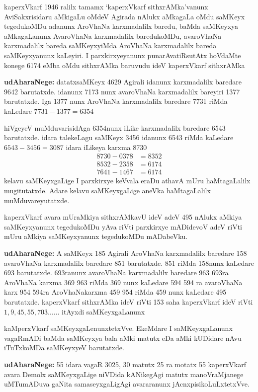 kaperxVkarf {\rm 1946} ralilx tamamx `kaperxVkarf sithxrAMka'vanunx AviSakxrisidaru aMkigaLu oMdeV Agirada nAlukx aMkagaLa oMdu saMKeyx tegedukoMDu adanunx AroVhaNa karxmadalilx baredu, baMda saMKeyxya aMkagaLanunx AvaroVhaNa karxmadalilx baredukoMDu, avaroVhaNa karxmadalilx bareda saMKeyxyiMda AroVhaNa karxmadalilx bareda saMKeyxyanunx kaLeyiri. I parxkirxyeyanunx punarAvatiRsutAtx hoVdaMte konege {\rm 6174} eMba oMdu sithxrAMka baruvudu ideV kaperxVkarf sithxrAMka

\textbf{udAharaNege:} 
datatxsaMKeyx {\rm 4629} Agirali idanunx karxmadalilx baredare {\rm 9642} barutatxde. idanunx {\rm 7173} nunx avaroVhaNa karxmadalilx bareyiri {\rm 1377} barutatxde. Iga {\rm 1377} nunx AroVhaNa karxmadalilx baredare {\rm 7731} riMda kaLedare
$7731-1377=6354$

hiVgeyeV muMduvarisidAga {\rm 6354}nunx iLike karxmadalilx baredare {\rm 6543} barutatxde. idara talekeLagu saMKeyx {\rm 3456} idanunx {6543} riMda kaLedare $6543-3456=3087$ idara iLikeya karxma {\rm 8730}
\begin{align*}
8730-0378&=8352\\
8532-2358&=6174\\
7641-1467&=6174
\end{align*}
kelavu saMKeyxgaLige I parxkirxye keVvala eraDu athavA mUru haMtagaLalilx mugitutatxde. Adare kelavu saMKeyxgaLige aneVka haMtagaLalilx muMduvareyutatxde.

kaperxVkarf avara mUraMkiya sithxrAMkavU ideV adeV {\rm 495} nAlukx aMkiya saMKeyxyanunx tegedukoMDu yAva riVti parxkirxye mADidevoV adeV riVti mUru aMkiya saMKeyxyanunx tegedukoMDu mADabeVku.

\textbf{udAharaNege:} 
A saMKeyx {\rm 185} Agirali AroVhaNa karxmadalilx baredare {\rm 158} avaroVhaNa karxmadalilx baredare {\rm 851} barutatxde.
{\rm 851} riMda {\rm 158}nunx kaLedare {\rm 693} barutatxde.
{\rm 693}ranunx avaroVhaNa karxmadalilx baredare {\rm 963} {\rm 693}ra AroVhaNa karxma {\rm 369}
{\rm 963} riMda {\rm 369} nunx kaLedare {594} {\rm 594} ra avaroVhaNa karx {\rm 954} {\rm 594}ra AroVhaNakarxma {\rm 459} {\rm 954} riMda {\rm 459} nunx kaLedare {\rm 495} barutatxde.
kaperxVkarf sithxrAMka ideV riVti {\rm 153} saha kaperxVkarf ideV riVti $1, 9, 45, 55, 703\ldots\ldots$ itAyxdi saMKeyxgaLanunx 

kaMperxVkarf saMKeyxgaLenunxtetxVve. EkeMdare I saMKeyxgaLanunx vagaRmADi baMda saMKeyxya bala aMki matutx eDa aMki kUDidare nAvu iTuTxkoMDa saMKeyxyeV barutatxde.

\textbf{udAharaNege:} {\rm 55} idara vagaR {\rm 3025}, {\rm 30} matutx {\rm 25} ra motatx {\rm 55} kaperxVkarf avara Demolx saMKeyxgaLige niVDida kANikegAgi matutx manoVraMjanege uMTumADuva gaNita samaseyxgaLigAgi avararanunx jAcnxpisikoLuLxtetxVve.

